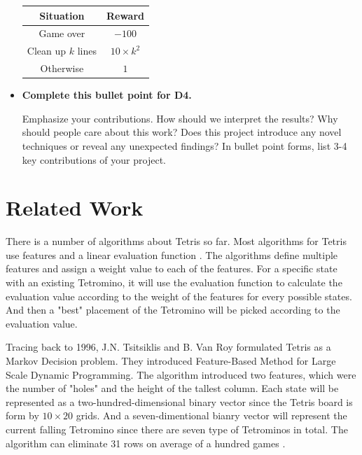 \documentclass[letterpaper]{article} %
\begin{document}
\begin{itemize}
\begin{itemize}
\end{itemize}
\begin{center}
  \begin{tabular}{ |c|c| } 
  \hline
  Situation & Reward  \\ 
  \hline
   Game over & $-100$  \\ 
   \hline
   Clean up $k$ lines & $10\times k^{2}$  \\ 
   \hline
   Otherwise & $1$  \\
   \hline
  \end{tabular}
\end{center}

\item 
{\bf Complete this bullet point for D4.}

Emphasize your contributions.  How should we interpret the results?  Why should people care about this work?   Does this project introduce any novel techniques or reveal any unexpected findings?  In bullet point forms, list 3-4 key contributions of your project.

\end{itemize}


\section{Related Work} 

There is a number of algorithms about Tetris so far. Most algorithms for Tetris use features and a linear evaluation function \cite{SO19}. The algorithms define multiple features and assign a weight value to each of the features. For a specific state with an existing Tetromino, it will use the evaluation function to calculate the evaluation value according to the weight of the features for every possible states. And then a "best" placement of the Tetromino will be picked according to the evaluation value.

Tracing back to 1996, J.N. Tsitsiklis and B. Van Roy formulated Tetris as a Markov Decision problem. They introduced Feature-Based Method for Large Scale Dynamic Programming. The algorithm introduced two features, which were the number of "holes" and the height of the tallest column. Each state will be represented as a two-hundred-dimensional binary vector since the Tetris board is form by $10 \times 20$ grids. And a seven-dimentional bianry vector will represent the current falling Tetromino since there are seven type of Tetrominos in total. The algorithm can eliminate 31 rows on average of a hundred games \cite{TV96}.
\end{document}
